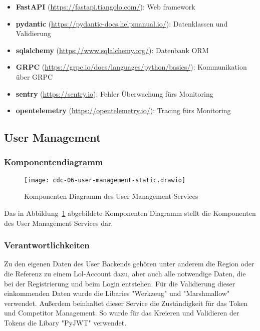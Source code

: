 \begin{itemize}
    \item \textbf{FastAPI} (\href{https://fastapi.tiangolo.com/}{https://fastapi.tiangolo.com/}): Web framework
    \item \textbf{pydantic} (\href{https://pydantic-docs.helpmanual.io/}{https://pydantic-docs.helpmanual.io/}): Datenklassen und Validierung
    \item \textbf{sqlalchemy} (\href{https://www.sqlalchemy.org/}{https://www.sqlalchemy.org/}): Datenbank ORM
    \item \textbf{GRPC} (\href{https://grpc.io/docs/languages/python/basics/}{https://grpc.io/docs/languages/python/basics/}): Kommunikation über GRPC
    \item \textbf{sentry} (\href{https://sentry.io}{https://sentry.io}): Fehler Überwachung fürs Monitoring
    \item \textbf{opentelemetry} (\href{https://opentelemetry.io/}{https://opentelemetry.io/}): Tracing fürs Monitoring
\end{itemize}

\subsection{User Management}
\subsubsection{Komponentendiagramm}\label{subsubsec:user-management-component-diagram}

\begin{figure}[H]
    \centering
    \texttt{[image: cdc-06-user-management-static.drawio]}
    \caption{Komponenten Diagramm des User Management Services}
    \label{fig:user-management-component-diagram}
\end{figure}

Das in Abbildung~\ref{fig:user-management-component-diagram} abgebildete Komponenten Diagramm stellt die
Komponenten des User Management Services dar.

\subsubsection{Verantwortlichkeiten}
Zu den eigenen Daten des User Backends gehören unter anderem die Region oder die Referenz zu einem Lol-Account dazu, 
aber auch alle notwendige Daten, die bei der Registrierung und beim Login entstehen. Für die Validierung dieser einkommenden Daten wurde die Libaries "Werkzeug" und "Marshmallow" verwendet.
Außerdem beinhaltet dieser Service die Zuständigkeit für das Token und Competitor Management. So wurde für das Kreieren und Validieren der Tokens die Libary
"PyJWT" verwendet.
